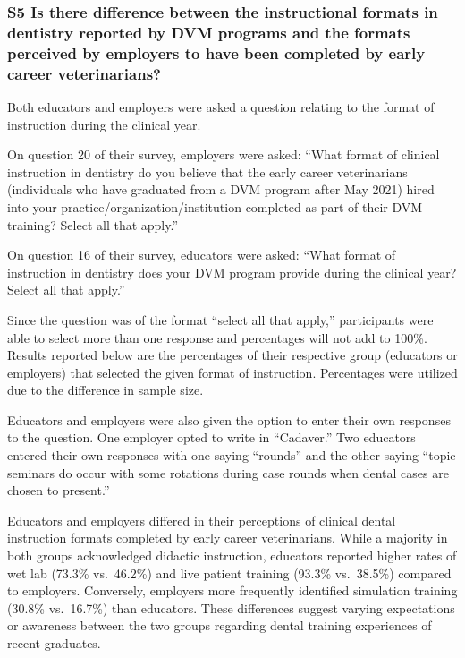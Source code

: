 \documentclass[
  11pt,
  letterpaper,
  DIV=11,
  numbers=noendperiod]{scrartcl}
\numberwithin{figure}{section}
\begin{document}
\subsubsection{S5 Is there difference between the instructional formats
in dentistry reported by DVM programs and the formats perceived by
employers to have been completed by early career
veterinarians?}\label{s5-is-there-difference-between-the-instructional-formats-in-dentistry-reported-by-dvm-programs-and-the-formats-perceived-by-employers-to-have-been-completed-by-early-career-veterinarians}

Both educators and employers were asked a question relating to the
format of instruction during the clinical year.

On question 20 of their survey, employers were asked: ``What format of
clinical instruction in dentistry do you believe that the early career
veterinarians (individuals who have graduated from a DVM program after
May 2021) hired into your practice/organization/institution completed as
part of their DVM training? Select all that apply.''

On question 16 of their survey, educators were asked: ``What format of
instruction in dentistry does your DVM program provide during the
clinical year? Select all that apply.''

Since the question was of the format ``select all that apply,''
participants were able to select more than one response and percentages
will not add to 100\%. Results reported below are the percentages of
their respective group (educators or employers) that selected the given
format of instruction. Percentages were utilized due to the difference
in sample size.

Educators and employers were also given the option to enter their own
responses to the question. One employer opted to write in ``Cadaver.''
Two educators entered their own responses with one saying ``rounds'' and
the other saying ``topic seminars do occur with some rotations during
case rounds when dental cases are chosen to present.''

Educators and employers differed in their perceptions of clinical dental
instruction formats completed by early career veterinarians. While a
majority in both groups acknowledged didactic instruction, educators
reported higher rates of wet lab (73.3\% vs.~46.2\%) and live patient
training (93.3\% vs.~38.5\%) compared to employers. Conversely,
employers more frequently identified simulation training (30.8\%
vs.~16.7\%) than educators. These differences suggest varying
expectations or awareness between the two groups regarding dental
training experiences of recent graduates.
\end{document}
